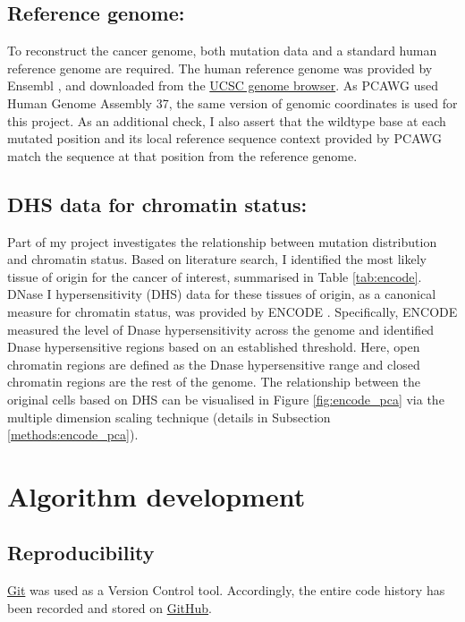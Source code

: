 \subsection{Reference genome:} 
To reconstruct the cancer genome, both mutation data and a standard human reference genome are required. The human reference genome was provided by Ensembl \citep{Yates2020Ensembl2020}, and downloaded from the \href{http://hgdownload.soe.ucsc.edu/goldenPath/hg19/chromosomes}{UCSC genome browser}. As PCAWG used Human Genome Assembly 37, the same version of genomic coordinates is used for this project. As an additional check, I also assert that the wildtype base at each mutated position and its local reference sequence context provided by PCAWG match the sequence at that position from the reference genome. 

\subsection{DHS data for chromatin status:} 
Part of my project investigates the relationship between mutation distribution and chromatin status. Based on literature search, I identified the most likely tissue of origin for the cancer of interest, summarised in Table \ref{tab:encode}. DNase I hypersensitivity (DHS) data for these tissues of origin, as a canonical measure for chromatin status, was provided by ENCODE \citep[downloaded from either \href{https://genome.ucsc.edu/cgi-bin/hgFileUi?db=hg19&g=wgEncodeOpenChromDnase}{Duke} or \href{https://genome.ucsc.edu/cgi-bin/hgFileUi?db=hg19&g=wgEncodeUwDnase}{UW};][]{Thurman2012TheGenome,Klemm2019ChromatinEpigenome}. Specifically, ENCODE measured the level of Dnase hypersensitivity across the genome and identified Dnase hypersensitive regions based on an established threshold. Here, open chromatin regions are defined as the Dnase hypersensitive range and closed chromatin regions are the rest of the genome. The relationship between the original cells based on DHS can be visualised in Figure \ref{fig:encode_pca} via the multiple dimension scaling technique (details in Subsection \ref{methods:encode_pca}). 

\section{Algorithm development}
\subsection{Reproducibility} 
\href{http://git-scm.com}{Git} was used as a Version Control tool. Accordingly, the entire code history has been recorded and stored on \href{https://github.com}{GitHub}.

